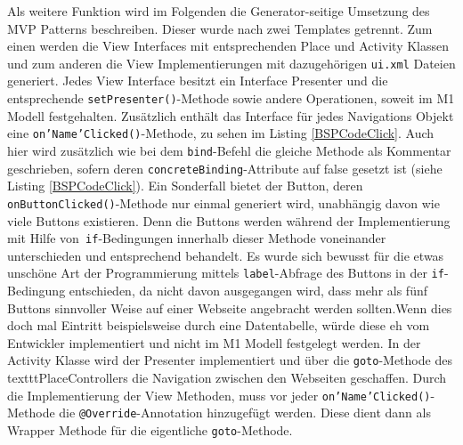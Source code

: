 Als weitere Funktion wird im Folgenden die Generator-seitige Umsetzung des MVP Patterns beschreiben. Dieser wurde nach zwei Templates getrennt. Zum einen werden die View Interfaces mit entsprechenden Place und Activity Klassen und zum anderen die View Implementierungen mit dazugehörigen \texttt{ui.xml} Dateien generiert.
Jedes View Interface besitzt ein Interface Presenter und die entsprechende \texttt{setPresenter()}-Methode sowie andere Operationen, soweit im M1 Modell festgehalten. Zusätzlich enthält das Interface für jedes Navigations Objekt eine \texttt{on'Name'Clicked()}-Methode, zu sehen im Listing \ref{BSPCodeClick}. Auch hier wird zusätzlich wie bei dem \texttt{bind}-Befehl die gleiche Methode als Kommentar geschrieben, sofern deren \texttt{concreteBinding}-Attribute auf false gesetzt ist (siehe Listing \ref{BSPCodeClick}). Ein Sonderfall bietet der Button, deren \texttt{onButtonClicked()}-Methode nur einmal generiert wird, unabhängig davon wie viele Buttons existieren. Denn die Buttons werden während der Implementierung mit Hilfe von\texttt{ if}-Bedingungen innerhalb dieser Methode voneinander unterschieden und entsprechend behandelt. Es wurde sich bewusst für die etwas unschöne Art der Programmierung mittels \texttt{label}-Abfrage des Buttons in der \texttt{if}-Bedingung entschieden, da nicht davon ausgegangen wird, dass mehr als fünf Buttons sinnvoller Weise auf einer Webseite angebracht werden sollten.Wenn dies doch mal Eintritt beispielsweise durch eine Datentabelle, würde diese eh vom Entwickler implementiert und nicht im M1 Modell festgelegt werden.
In der Activity Klasse wird der Presenter implementiert und über die \texttt{goto}-Methode des texttt{PlaceController}s die Navigation zwischen den Webseiten geschaffen. Durch die Implementierung der View Methoden, muss vor jeder \texttt{on'Name'Clicked()}-Methode die \texttt{@Override}-Annotation hinzugefügt werden. Diese dient dann als Wrapper Methode für die eigentliche \texttt{goto}-Methode.
\lstset{language=mtl}
